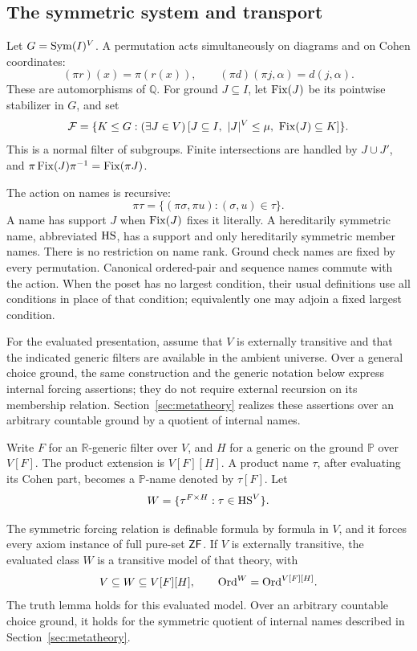 \subsection{The symmetric system and transport}

Let \(G=\operatorname{Sym}(I)^V\).  A permutation acts simultaneously on diagrams
and on Cohen coordinates:
\[
 (\pi r)(x)=\pi(r(x)),\qquad
 (\pi d)(\pi j,\alpha)=d(j,\alpha).
\]
These are automorphisms of \(\mathbb Q\).
For ground \(J\subseteq I\), let \(\operatorname{Fix}(J)\) be its pointwise
stabilizer in \(G\), and set
\[
 \mathcal F=
 \{K\leq G:(\exists J\in V)\,
       [J\subseteq I,\ |J|^V\leq\mu,\ \operatorname{Fix}(J)\subseteq K]\}.
\]
This is a normal filter of subgroups.
Finite intersections are handled by \(J\cup J'\), and
\(\pi\operatorname{Fix}(J)\pi^{-1}=\operatorname{Fix}(\pi J)\).

The action on names is recursive:
\[
 \pi\tau=\{(\pi\sigma,\pi u):(\sigma,u)\in\tau\}.
\]
A name has support \(J\) when \(\operatorname{Fix}(J)\) fixes it literally.
A hereditarily symmetric name, abbreviated \(\mathrm{HS}\), has a support
and only hereditarily symmetric member names.
There is no restriction on name rank.
Ground check names are fixed by every permutation.
Canonical ordered-pair and sequence names commute with the action.
When the poset has no largest condition, their usual definitions use
all conditions in place of that condition; equivalently one may
adjoin a fixed largest condition.

For the evaluated presentation, assume that \(V\) is externally
transitive and that the indicated generic filters are available in the
ambient universe.  Over a general choice ground, the same construction
and the generic notation below express internal forcing assertions;
they do not require external recursion on its membership relation.
Section~\ref{sec:metatheory} realizes these assertions over an arbitrary
countable ground by a quotient of internal names.

Write \(F\) for an \(\mathbb R\)-generic filter over \(V\), and
\(H\) for a generic on the ground \(\mathbb P\) over \(V[F]\).
The product extension is \(V[F][H]\).  A product name \(\tau\),
after evaluating its Cohen part, becomes a \(\mathbb P\)-name
denoted by \(\tau[F]\).
Let
\[
 W=\{\tau^{F\times H}:\tau\in\mathrm{HS}^V\}.
\]

\begin{theorem}\label{thm:symmetric-model}
The symmetric forcing relation is definable formula by formula in
\(V\), and it forces every axiom instance of full pure-set \(\mathsf{ZF}\).
If \(V\) is externally transitive, the evaluated class \(W\) is
a transitive model of that theory, with
\[
 V\subseteq W\subseteq V[F][H],
 \qquad \mathrm{Ord}^W=\mathrm{Ord}^{V[F][H]}.
\]
The truth lemma holds for this evaluated model.  Over an arbitrary
countable choice ground, it holds for the symmetric quotient of internal
names described in Section~\ref{sec:metatheory}.
\end{theorem}


